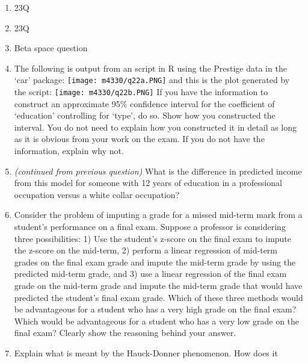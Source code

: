 \documentclass[
]{article}
\begin{document}
\begin{enumerate}
\item
  23Q \vspace{0px}
\item
  23Q \vspace{0px}
\item
  Beta space question \vspace{0px}
\item
  The following is output from an script in R using the Prestige data in
  the `car' package: \newline \texttt{[image: m4330/q22a.PNG]}
  \newline and this is the plot generated by the script:
  \newline \texttt{[image: m4330/q22b.PNG]} \newline If you have the
  information to construct an approximate 95\% confidence interval for
  the coefficient of `education' controlling for `type', do so. Show how
  you constructed the interval. You do not need to explain how you
  constructed it in detail as long as it is obvious from your work on
  the exam. If you do not have the information, explain why not.
  \vspace{0px}
\item
  \emph{(continued from previous question)} What is the difference in
  predicted income from this model for someone with 12 years of
  education in a professional occupation versus a white collar
  occupation? \vspace{0px}
\item
  Consider the problem of imputing a grade for a missed mid-term mark
  from a student's performance on a final exam. Suppose a professor is
  considering three possibilities: 1) Use the student's z-score on the
  final exam to impute the z-score on the mid-term, 2) perform a linear
  regression of mid-term grades on the final exam grade and impute the
  mid-term grade by using the predicted mid-term grade, and 3) use a
  linear regression of the final exam grade on the mid-term grade and
  impute the mid-term grade that would have predicted the student's
  final exam grade. \newline Which of these three methods would be
  advantageous for a student who has a very high grade on the final
  exam? Which would be advantageous for a student who has a very low
  grade on the final exam? Clearly show the reasoning behind your
  answer. \vspace{0px}
\item
  Explain what is meant by the Hauck-Donner phenomenon. How does it

\end{enumerate}
\end{document}
